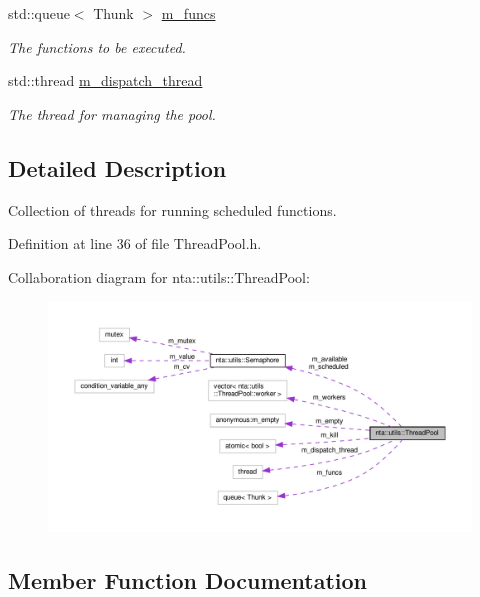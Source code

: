 \begin{DoxyCompactItemize}
std\+::queue$<$ Thunk $>$ \hyperlink{classnta_1_1utils_1_1ThreadPool_a828f1c41f02f5ecce36e72a2a3328eb3}{m\+\_\+funcs}
\begin{DoxyCompactList}\small\item\em The functions to be executed. \end{DoxyCompactList}\item 
\mbox{\label{classnta_1_1utils_1_1ThreadPool_a6fe6bfa4607803f5f3f9b64b47c0417a}} 
std\+::thread \hyperlink{classnta_1_1utils_1_1ThreadPool_a6fe6bfa4607803f5f3f9b64b47c0417a}{m\+\_\+dispatch\+\_\+thread}
\begin{DoxyCompactList}\small\item\em The thread for managing the pool. \end{DoxyCompactList}\end{DoxyCompactItemize}


\subsection{Detailed Description}
Collection of threads for running scheduled functions. 

Definition at line 36 of file Thread\+Pool.\+h.



Collaboration diagram for nta\+:\+:utils\+:\+:Thread\+Pool\+:\nopagebreak
\begin{figure}[H]
\begin{center}
\leavevmode
\includegraphics[width=350pt]{d2/d5d/classnta_1_1utils_1_1ThreadPool__coll__graph}
\end{center}
\end{figure}


\subsection{Member Function Documentation}
\mbox{\label{classnta_1_1utils_1_1ThreadPool_a2ca98ba5ed4510e5aac90c0507859b8d}} 
